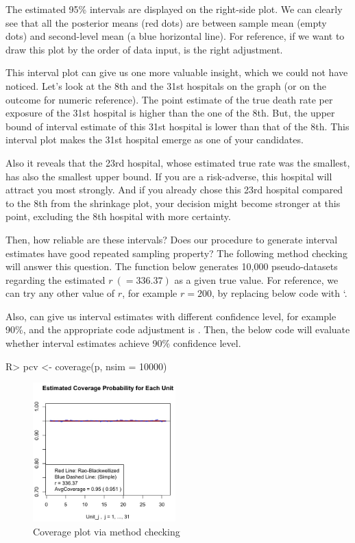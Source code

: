 \documentclass[article]{jss}
\begin{document}
The estimated 95\% intervals are displayed on the right-side plot. We can clearly see that all the posterior means (red dots) are between sample mean (empty dots) and second-level mean (a blue horizontal line). For reference, if we want to draw this plot by the order of data input,  is the right adjustment. 


This interval plot can give us one more valuable insight, which we could not have noticed. Let's look at the 8th and the 31st hospitals on the graph (or on the outcome for numeric reference). The point estimate of the true death rate per exposure of the 31st hospital is higher than the one of the 8th. But, the upper bound of interval estimate of this 31st hospital is lower than that of the 8th. This interval plot makes the 31st hospital emerge as one of your candidates.


Also it reveals that the 23rd hospital, whose estimated true rate was the smallest, has also the smallest upper bound. If you are a risk-adverse, this hospital will attract you most strongly. And if you already chose this 23rd hospital compared to the 8th from the shrinkage plot, your decision might become stronger at this point, excluding the 8th hospital with more certainty. 


Then, how reliable are these intervals? Does our procedure to generate interval estimates have good repeated sampling property? The following method checking will answer this question. The  function below generates 10,000 pseudo-datasets regarding the estimated $r~(=336.37)$ as a given true value. For reference, we can try any other value of $r$, for example $r=200$, by replacing below code with `.


Also,  can give us interval estimates with different confidence level, for example 90\%,  and the appropriate code adjustment is .  Then, the below code will evaluate whether interval estimates achieve 90\% confidence level.

\begin{CodeChunk}
\begin{CodeInput}
R> pcv <- coverage(p, nsim = 10000)
\end{CodeInput}
\end{CodeChunk}
\begin{figure}[h] 
\label{fig:hospital_coverage}
\begin{center}
\includegraphics[width = 5.5cm]{hospital2.png}
\caption{Coverage plot via method checking}
\end{center}
\end{figure}
\end{document}

